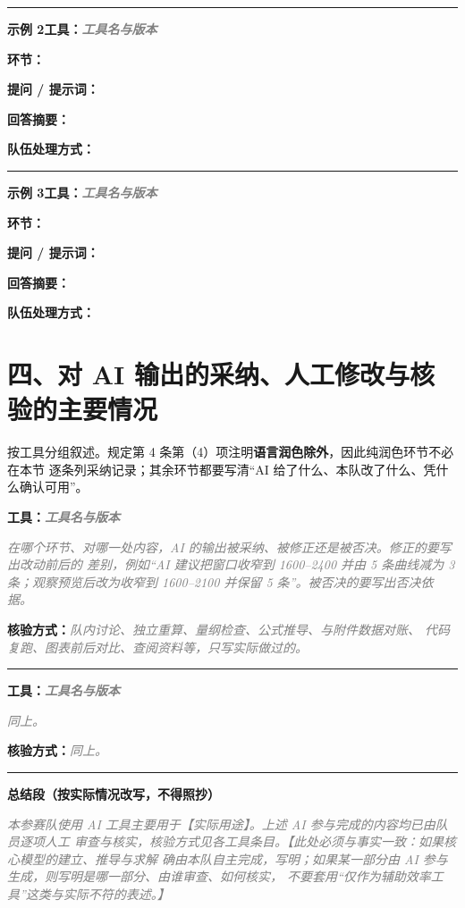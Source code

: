\documentclass[UTF8,a4paper,12pt]{ctexart}
\newcommand{\Fill}[1]{\textcolor{gray}{\textit{#1}}}
\newcommand{\Field}[1]{\par\noindent\textbf{#1}}
\begin{document}
\vspace{0.5em}
\noindent\rule{\linewidth}{0.35pt}

\vspace{0.5em}
\noindent\textbf{示例 2\quad 工具：\Fill{工具名与版本}}
\Field{环节：}\Fill{}
\Field{提问 / 提示词：}\Fill{}
\Field{回答摘要：}\Fill{}
\Field{队伍处理方式：}\Fill{}

\vspace{0.5em}
\noindent\rule{\linewidth}{0.35pt}

\vspace{0.5em}
\noindent\textbf{示例 3\quad 工具：\Fill{工具名与版本}}
\Field{环节：}\Fill{}
\Field{提问 / 提示词：}\Fill{}
\Field{回答摘要：}\Fill{}
\Field{队伍处理方式：}\Fill{}

\section*{四、对 AI 输出的采纳、人工修改与核验的主要情况}

按工具分组叙述。规定第 4 条第（4）项注明\textbf{语言润色除外}，因此纯润色环节不必在本节
逐条列采纳记录；其余环节都要写清“AI 给了什么、本队改了什么、凭什么确认可用”。

\vspace{0.3em}
\noindent\textbf{工具：\Fill{工具名与版本}}

\Fill{在哪个环节、对哪一处内容，AI 的输出被采纳、被修正还是被否决。修正的要写出改动前后的
差别，例如“AI 建议把窗口收窄到 1600--2400 并由 5 条曲线减为 3 条；观察预览后改为收窄到
1600--2100 并保留 5 条”。被否决的要写出否决依据。}

\Field{核验方式：}\Fill{队内讨论、独立重算、量纲检查、公式推导、与附件数据对账、
代码复跑、图表前后对比、查阅资料等，只写实际做过的。}

\vspace{0.5em}
\noindent\rule{\linewidth}{0.35pt}

\vspace{0.5em}
\noindent\textbf{工具：\Fill{工具名与版本}}

\Fill{同上。}

\Field{核验方式：}\Fill{同上。}

\vspace{0.8em}
\noindent\rule{\linewidth}{0.35pt}

\vspace{0.5em}
\noindent\textbf{总结段（按实际情况改写，不得照抄）}

\Fill{本参赛队使用 AI 工具主要用于【实际用途】。上述 AI 参与完成的内容均已由队员逐项人工
审查与核实，核验方式见各工具条目。【此处必须与事实一致：如果核心模型的建立、推导与求解
确由本队自主完成，写明；如果某一部分由 AI 参与生成，则写明是哪一部分、由谁审查、如何核实，
不要套用“仅作为辅助效率工具”这类与实际不符的表述。】}
\end{document}
